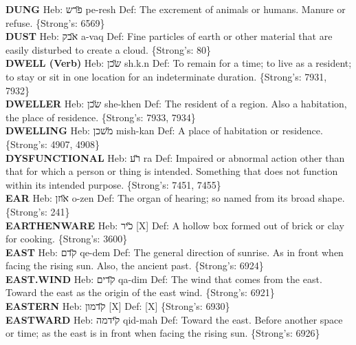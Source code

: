 {\textbf{DUNG} Heb: {\large\H פרש} pe-resh Def: The excrement of animals or humans. Manure or refuse. \{Strong's: 6569\}\hfill{}\\

\textbf{DUST} Heb: {\large\H אבק} a-vaq Def: Fine particles of earth or other material that are easily disturbed to create a cloud. \{Strong's: 80\}\hfill{}\\

\textbf{DWELL (Verb)} Heb: {\large\H שכן} sh.k.n Def: To remain for a time; to live as a resident; to stay or sit in one location for an indeterminate duration. \{Strong's: 7931, 7932\}\hfill{}\\

\textbf{DWELLER} Heb: {\large\H שכן} she-khen Def: The resident of a region. Also a habitation, the place of residence. \{Strong's: 7933, 7934\}\hfill{}\\

\textbf{DWELLING} Heb: {\large\H משכן} mish-kan Def: A place of habitation or residence. \{Strong's: 4907, 4908\}\hfill{}\\

\textbf{DYSFUNCTIONAL} Heb: {\large\H רע} ra Def: Impaired or abnormal action other than that for which a person or thing is intended. Something that does not function within its intended purpose. \{Strong's: 7451, 7455\}\hfill{}\\

\textbf{EAR} Heb: {\large\H אוזן} o-zen Def: The organ of hearing; so named from its broad shape. \{Strong's: 241\}\hfill{}\\

\textbf{EARTHENWARE} Heb: {\large\H כיר} {[}X{]} Def: A hollow box formed out of brick or clay for cooking. \{Strong's: 3600\}\hfill{}\\

\textbf{EAST} Heb: {\large\H קדם} qe-dem Def: The general direction of sunrise. As in front when facing the rising sun. Also, the ancient past. \{Strong's: 6924\}\hfill{}\\

\textbf{EAST.WIND} Heb: {\large\H קדים} qa-dim Def: The wind that comes from the east. Toward the east as the origin of the east wind. \{Strong's: 6921\}\hfill{}\\

\textbf{EASTERN} Heb: {\large\H קדמון} {[}X{]} Def: {[}X{]} \{Strong's: 6930\}\hfill{}\\

\textbf{EASTWARD} Heb: {\large\H קידמה} qid-mah Def: Toward the east. Before another space or time; as the east is in front when facing the rising sun. \{Strong's: 6926\}\hfill{}\\

}
